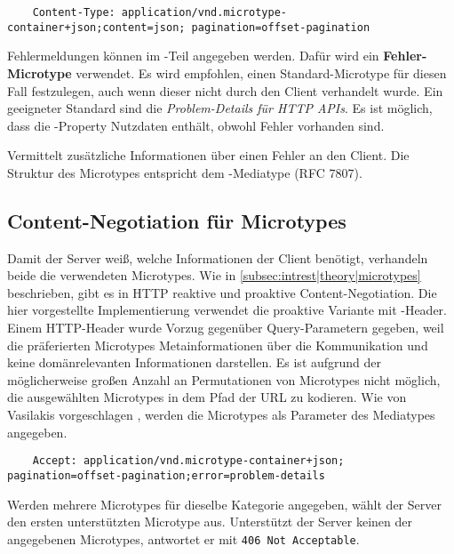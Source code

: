 \begin{verbatim}
    Content-Type: application/vnd.microtype-container+json;content=json; pagination=offset-pagination
\end{verbatim}

\noindent{}Fehlermeldungen können im -Teil angegeben werden. Dafür wird ein \textbf{Fehler-Microtype} verwendet. Es wird empfohlen, einen Standard-Microtype für diesen Fall festzulegen, auch wenn dieser nicht durch den Client verhandelt wurde. Ein geeigneter Standard sind die \emph{Problem-Details für HTTP APIs}. Es ist möglich, dass die -Property Nutzdaten enthält, obwohl Fehler vorhanden sind.

\begin{microtypedef}
    Vermittelt zusätzliche Informationen über einen Fehler an den Client. Die Struktur des Microtypes entspricht dem -Mediatype (RFC 7807).
\end{microtypedef}

\subsection{Content-Negotiation für Microtypes}
Damit der Server weiß, welche Informationen der Client benötigt, verhandeln beide die verwendeten Microtypes. Wie in \cref{subsec:intrest|theory|microtypes} beschrieben, gibt es in HTTP reaktive und proaktive Content-Negotiation. Die hier vorgestellte Implementierung verwendet die proaktive Variante mit -Header. Einem HTTP-Header wurde Vorzug gegenüber Query-Parametern gegeben, weil die präferierten Microtypes Metainformationen über die Kommunikation und keine domänrelevanten Informationen darstellen. Es ist aufgrund der möglicherweise großen Anzahl an Permutationen von Microtypes nicht möglich, die ausgewählten Microtypes in dem Pfad der URL zu kodieren. Wie von Vasilakis vorgeschlagen \autocite[Abs.~10.2]{Vasilakis2017}, werden die Microtypes als Parameter des Mediatypes angegeben.

\begin{verbatim}
    Accept: application/vnd.microtype-container+json; pagination=offset-pagination;error=problem-details
\end{verbatim}

Werden mehrere Microtypes für dieselbe Kategorie angegeben, wählt der Server den ersten unterstützten Microtype aus. Unterstützt der Server keinen der angegebenen Microtypes, antwortet er mit \texttt{406 Not Acceptable}.

